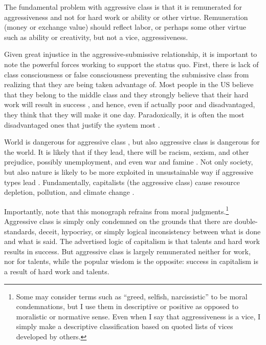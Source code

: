 \documentclass[11pt, letterpaper]{article}
\begin{document}
\begin{spacing}{2.0}
The fundamental problem with aggressive class is that it is remunerated for
aggressiveness and not for hard work or ability or other virtue. Remuneration
(money or exchange value) should reflect labor, or perhaps some other virtue
such as ability or creativity, but not a vice, aggressiveness.

Given great injustice in the aggressive-submissive relationship, it is important
 to note the powerful forces working to support the status
 quo. First, there is lack of class consciousness or false consciousness
 \citep{marx12,marx10}  preventing the submissive class from realizing that they
 are being taken  advantage of. Most people in the US believe that they belong
 to the middle  class and they strongly believe that their  hard work will result in success \citep{aokditella}, and
 hence, even if actually poor and disadvantaged, they think that they will make it one
 day.  Paradoxically, it is often the most disadvantaged ones that justify the system most \citep{jost94, jost04}.

World is dangerous for aggressive class %
\citep{perry13}, %
but also aggressive class is dangerous for the world.
It is likely that if
they lead, there will be  racism, sexism, and other  prejudice, possibly
unemployment, and even war and famine  \citep{altemeyer03,altemeyer04}. Not only
society, but also nature is likely to be more exploited in unsustainable way if aggressive types lead  \citep{milfont13,klein14}%
. Fundamentally, capitalists (the aggressive class)  cause resource depletion, pollution, and climate change \citep{harvey14,klein14}.

Importantly, note that this monograph refrains from moral judgments.\footnote{Some
may consider terms such as ``greed, selfish, narcissistic'' to be moral
condemnations, but I use them in descriptive or positive as opposed to
moralistic or normative sense. Even when I say that aggressiveness is a vice, I
simply make a descriptive classification based on quoted lists of vices
developed by others.} Aggressive
class is simply only condemned on the grounds that there are double-standards,
deceit, hypocrisy, or simply logical
inconsistency between what is done and what is said. The advertised logic of capitalism is that talents and hard work
results in success.
But aggressive class is largely remunerated neither for 
work, nor for talents, while the popular wisdom is the opposite:
success in capitalism is a result of hard work and talents. 


\end{spacing}
\end{document}
